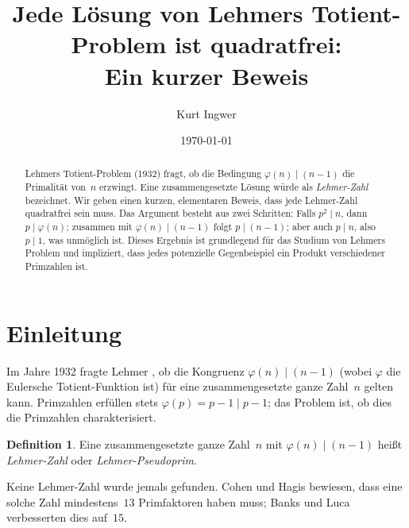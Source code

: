 \documentclass[12pt,a4paper]{amsart}
\theoremstyle{definition}
\newtheorem{definition}[theorem]{Definition}
\newcommand{\euler}{\varphi}
\begin{document}

\title{Jede Lösung von Lehmers Totient-Problem ist quadratfrei:\\ Ein kurzer Beweis}

\author{Kurt Ingwer}
\address{Specialist Mathematics Project, Version Build 44}
\date{\today}

\begin{abstract}
Lehmers Totient-Problem (1932) fragt, ob die Bedingung $\euler(n) \mid (n-1)$
die Primalität von~$n$ erzwingt. Eine zusammengesetzte Lösung würde als
\emph{Lehmer-Zahl} bezeichnet. Wir geben einen kurzen, elementaren Beweis, dass
jede Lehmer-Zahl quadratfrei sein muss. Das Argument besteht aus zwei Schritten:
Falls $p^2 \mid n$, dann $p \mid \euler(n)$; zusammen mit $\euler(n) \mid (n-1)$
folgt $p \mid (n-1)$; aber auch $p \mid n$, also $p \mid 1$, was unmöglich ist.
Dieses Ergebnis ist grundlegend für das Studium von Lehmers Problem und impliziert,
dass jedes potenzielle Gegenbeispiel ein Produkt verschiedener Primzahlen ist.
\end{abstract}

\maketitle

\section{Einleitung}

Im Jahre 1932 fragte Lehmer \cite{Lehmer1932}, ob die Kongruenz
$\euler(n) \mid (n-1)$ (wobei $\euler$ die Eulersche Totient-Funktion ist)
für eine zusammengesetzte ganze Zahl~$n$ gelten kann. Primzahlen erfüllen stets
$\euler(p) = p-1 \mid p-1$; das Problem ist, ob dies die Primzahlen charakterisiert.

\begin{definition}
Eine zusammengesetzte ganze Zahl~$n$ mit $\euler(n) \mid (n-1)$ heißt
\emph{Lehmer-Zahl} oder \emph{Lehmer-Pseudoprim}.
\end{definition}

Keine Lehmer-Zahl wurde jemals gefunden. Cohen und Hagis \cite{Cohen1980} bewiesen,
dass eine solche Zahl mindestens~$13$ Primfaktoren haben muss; Banks und Luca
\cite{Banks2009} verbesserten dies auf~$15$.
\end{document}
